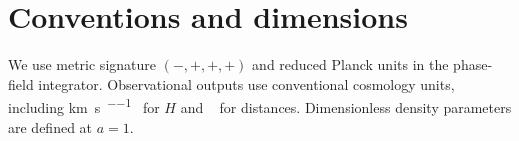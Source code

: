 \section{Conventions and dimensions}
We use metric signature $(-,+,+,+)$ and reduced Planck units in the phase-field integrator. Observational outputs use conventional cosmology units, including \si{\kilo\metre\per\second\per\mega\parsec} for $H$ and \si{\mega\parsec} for distances. Dimensionless density parameters are defined at $a=1$.